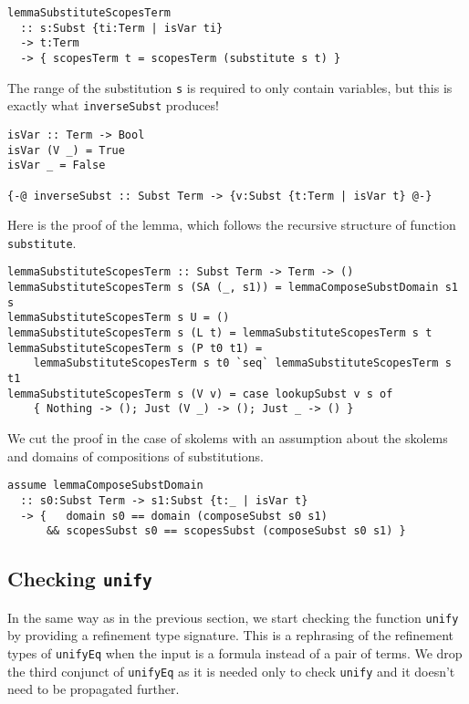 \documentclass[sigconf, anonymous, review]{acmart}
\newcommand{\tc}[1]{{\small\texttt{#1}}}
\begin{document}
\begin{verbatim}
lemmaSubstituteScopesTerm
  :: s:Subst {ti:Term | isVar ti}
  -> t:Term
  -> { scopesTerm t = scopesTerm (substitute s t) }
\end{verbatim}

The range of the substitution \tc{s} is required to only contain variables, but
this is exactly what \tc{inverseSubst} produces!

\begin{verbatim}
isVar :: Term -> Bool
isVar (V _) = True
isVar _ = False

{-@ inverseSubst :: Subst Term -> {v:Subst {t:Term | isVar t} @-}
\end{verbatim}

Here is the proof of the lemma, which follows the recursive structure
of function \tc{substitute}.

\begin{verbatim}
lemmaSubstituteScopesTerm :: Subst Term -> Term -> ()
lemmaSubstituteScopesTerm s (SA (_, s1)) = lemmaComposeSubstDomain s1 s
lemmaSubstituteScopesTerm s U = ()
lemmaSubstituteScopesTerm s (L t) = lemmaSubstituteScopesTerm s t
lemmaSubstituteScopesTerm s (P t0 t1) =
    lemmaSubstituteScopesTerm s t0 `seq` lemmaSubstituteScopesTerm s t1
lemmaSubstituteScopesTerm s (V v) = case lookupSubst v s of
    { Nothing -> (); Just (V _) -> (); Just _ -> () }
\end{verbatim}

We cut the proof in the case of skolems with an assumption about the
skolems and domains of compositions of substitutions.

\begin{verbatim}
assume lemmaComposeSubstDomain
  :: s0:Subst Term -> s1:Subst {t:_ | isVar t}
  -> {   domain s0 == domain (composeSubst s0 s1)
      && scopesSubst s0 == scopesSubst (composeSubst s0 s1) }
\end{verbatim}


\subsection{Checking \tc{unify}}

In the same way as in the previous section, we start checking the function \tc{unify}
by providing a refinement type signature. This is a rephrasing of the refinement
types of \tc{unifyEq} when the input is a formula instead of a pair of terms. We
drop the third conjunct of \tc{unifyEq} as it is needed only to check \tc{unify} and
it doesn't need to be propagated further.
\end{document}
